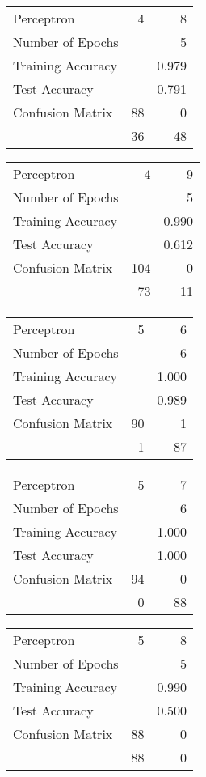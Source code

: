 \documentclass[11pt]{article}
\begin{document}
\begin{minipage}[t]{0.5\textwidth}
\begin{tabular}{|l | r r|}
\hline Perceptron & 4 & 8\\
Number of Epochs & & 5\\
Training Accuracy & & 0.979\\
Test Accuracy & & 0.791\\
Confusion Matrix & 88 & 0\\
 &36 & 48\\ \hline
\end{tabular}
\end{minipage}
\begin{minipage}[t]{0.5\textwidth}
\begin{tabular}{|l | r r|}
\hline Perceptron & 4 & 9\\
Number of Epochs & & 5\\
Training Accuracy & & 0.990\\
Test Accuracy & & 0.612\\
Confusion Matrix & 104 & 0\\
 &73 & 11\\ \hline
\end{tabular}
\end{minipage}
\begin{minipage}[t]{0.5\textwidth}
\begin{tabular}{|l | r r|}
\hline Perceptron & 5 & 6\\
Number of Epochs & & 6\\
Training Accuracy & & 1.000\\
Test Accuracy & & 0.989\\
Confusion Matrix & 90 & 1\\
 &1 & 87\\ \hline
\end{tabular}
\end{minipage}
\begin{minipage}[t]{0.5\textwidth}
\begin{tabular}{|l | r r|}
\hline Perceptron & 5 & 7\\
Number of Epochs & & 6\\
Training Accuracy & & 1.000\\
Test Accuracy & & 1.000\\
Confusion Matrix & 94 & 0\\
 &0 & 88\\ \hline
\end{tabular}
\end{minipage}
\begin{minipage}[t]{0.5\textwidth}
\begin{tabular}{|l | r r|}
\hline Perceptron & 5 & 8\\
Number of Epochs & & 5\\
Training Accuracy & & 0.990\\
Test Accuracy & & 0.500\\
Confusion Matrix & 88 & 0\\
 &88 & 0\\ \hline
\end{tabular}
\end{minipage}
\end{document}
